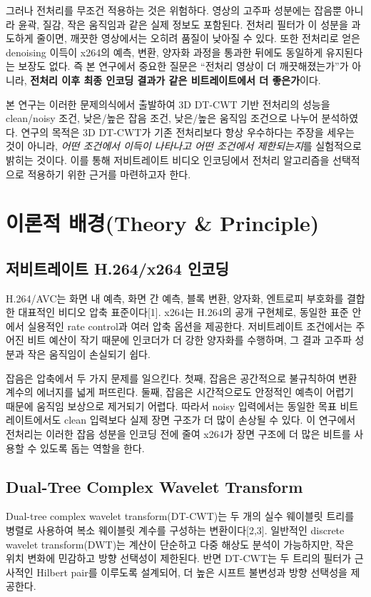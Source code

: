 \documentclass[10pt]{article}
\begin{document}
그러나 전처리를 무조건 적용하는 것은 위험하다. 영상의 고주파 성분에는 잡음뿐 아니라 윤곽, 질감, 작은 움직임과 같은 실제 정보도 포함된다. 전처리 필터가 이 성분을 과도하게 줄이면, 깨끗한 영상에서는 오히려 품질이 낮아질 수 있다. 또한 전처리로 얻은 denoising 이득이 x264의 예측, 변환, 양자화 과정을 통과한 뒤에도 동일하게 유지된다는 보장도 없다. 즉 본 연구에서 중요한 질문은 ``전처리 영상이 더 깨끗해졌는가''가 아니라, \textbf{전처리 이후 최종 인코딩 결과가 같은 비트레이트에서 더 좋은가}이다.

본 연구는 이러한 문제의식에서 출발하여 3D DT-CWT 기반 전처리의 성능을 clean/noisy 조건, 낮은/높은 잡음 조건, 낮은/높은 움직임 조건으로 나누어 분석하였다. 연구의 목적은 3D DT-CWT가 기존 전처리보다 항상 우수하다는 주장을 세우는 것이 아니라, \textit{어떤 조건에서 이득이 나타나고 어떤 조건에서 제한되는지}를 실험적으로 밝히는 것이다. 이를 통해 저비트레이트 비디오 인코딩에서 전처리 알고리즘을 선택적으로 적용하기 위한 근거를 마련하고자 한다.

\section{\large \bf 이론적 배경(Theory \& Principle)}
\subsection{저비트레이트 H.264/x264 인코딩}
H.264/AVC는 화면 내 예측, 화면 간 예측, 블록 변환, 양자화, 엔트로피 부호화를 결합한 대표적인 비디오 압축 표준이다[1]. x264는 H.264의 공개 구현체로, 동일한 표준 안에서 실용적인 rate control과 여러 압축 옵션을 제공한다. 저비트레이트 조건에서는 주어진 비트 예산이 작기 때문에 인코더가 더 강한 양자화를 수행하며, 그 결과 고주파 성분과 작은 움직임이 손실되기 쉽다.

잡음은 압축에서 두 가지 문제를 일으킨다. 첫째, 잡음은 공간적으로 불규칙하여 변환 계수의 에너지를 넓게 퍼뜨린다. 둘째, 잡음은 시간적으로도 안정적인 예측이 어렵기 때문에 움직임 보상으로 제거되기 어렵다. 따라서 noisy 입력에서는 동일한 목표 비트레이트에서도 clean 입력보다 실제 장면 구조가 더 많이 손상될 수 있다. 이 연구에서 전처리는 이러한 잡음 성분을 인코딩 전에 줄여 x264가 장면 구조에 더 많은 비트를 사용할 수 있도록 돕는 역할을 한다.

\subsection{Dual-Tree Complex Wavelet Transform}
Dual-tree complex wavelet transform(DT-CWT)는 두 개의 실수 웨이블릿 트리를 병렬로 사용하여 복소 웨이블릿 계수를 구성하는 변환이다[2,3]. 일반적인 discrete wavelet transform(DWT)는 계산이 단순하고 다중 해상도 분석이 가능하지만, 작은 위치 변화에 민감하고 방향 선택성이 제한된다. 반면 DT-CWT는 두 트리의 필터가 근사적인 Hilbert pair를 이루도록 설계되어, 더 높은 시프트 불변성과 방향 선택성을 제공한다.
\end{document}
